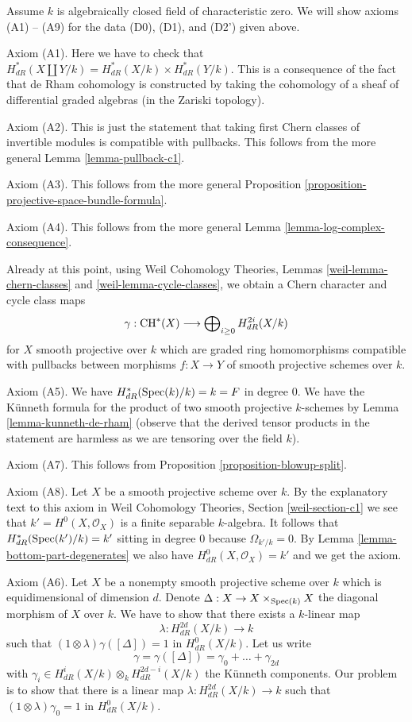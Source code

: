 \medskip\noindent
Assume $k$ is algebraically closed field of characteristic zero.
We will show axioms (A1) -- (A9) for the data (D0), (D1), and (D2')
given above.

\medskip\noindent
Axiom (A1). Here we have to check that
$H^*_{dR}(X \coprod Y/k) =  H^*_{dR}(X/k) \times H^*_{dR}(Y/k)$.
This is a consequence of the fact that de Rham cohomology
is constructed by taking the cohomology of a sheaf of differential
graded algebras (in the Zariski topology).

\medskip\noindent
Axiom (A2). This is just the statement that taking first Chern
classes of invertible modules is compatible with pullbacks.
This follows from the more general Lemma \ref{lemma-pullback-c1}.

\medskip\noindent
Axiom (A3). This follows from the more general
Proposition \ref{proposition-projective-space-bundle-formula}.

\medskip\noindent
Axiom (A4). This follows from the more general
Lemma \ref{lemma-log-complex-consequence}.

\medskip\noindent
Already at this point, using
Weil Cohomology Theories, Lemmas \ref{weil-lemma-chern-classes} and
\ref{weil-lemma-cycle-classes}, we obtain a Chern character and
cycle class maps
$$
\gamma :
\mathop{\mathrm{CH}}\nolimits^*(X)
\longrightarrow
\bigoplus\nolimits_{i \geq 0} H^{2i}_{dR}(X/k)
$$
for $X$ smooth projective over $k$ which are graded ring homomorphisms
compatible with pullbacks between morphisms $f : X \to Y$
of smooth projective schemes over $k$.

\medskip\noindent
Axiom (A5). We have $H_{dR}^*(\mathop{\mathrm{Spec}}(k)/k) = k = F$ in degree $0$.
We have the K\"unneth formula for the product of two smooth projective
$k$-schemes by Lemma \ref{lemma-kunneth-de-rham} (observe that the
derived tensor products in the statement are harmless as we are
tensoring over the field $k$).

\medskip\noindent
Axiom (A7). This follows from Proposition \ref{proposition-blowup-split}.

\medskip\noindent
Axiom (A8). Let $X$ be a smooth projective scheme over $k$.
By the explanatory text to this axiom in
Weil Cohomology Theories, Section \ref{weil-section-c1}
we see that $k' = H^0(X, \mathcal{O}_X)$ is a finite
separable $k$-algebra. It follows that $H_{dR}^*(\mathop{\mathrm{Spec}}(k')/k) = k'$
sitting in degree $0$ because $\Omega_{k'/k} = 0$. By
Lemma \ref{lemma-bottom-part-degenerates}
we also have $H_{dR}^0(X, \mathcal{O}_X) = k'$ and we get
the axiom.

\medskip\noindent
Axiom (A6). Let $X$ be a nonempty smooth projective scheme over $k$
which is equidimensional of dimension $d$. Denote
$\Delta : X \to X \times_{\mathop{\mathrm{Spec}}(k)} X$
the diagonal morphism of $X$ over $k$. We have to show that there
exists a $k$-linear map
$$
\lambda : H_{dR}^{2d}(X/k) \longrightarrow k
$$
such that $(1 \otimes \lambda)\gamma([\Delta]) = 1$ in $H^0_{dR}(X/k)$.
Let us write
$$
\gamma = \gamma([\Delta]) = \gamma_0 + \ldots + \gamma_{2d}
$$
with $\gamma_i \in H_{dR}^i(X/k) \otimes_k H_{dR}^{2d - i}(X/k)$
the K\"unneth components. Our problem is to show that there is a
linear map $\lambda : H_{dR}^{2d}(X/k) \to k$ such that
$(1 \otimes \lambda)\gamma_0 = 1$ in $H^0_{dR}(X/k)$.

